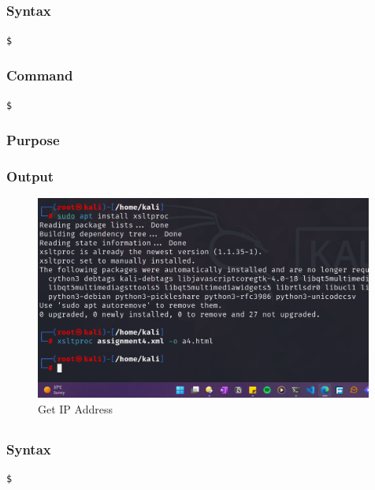 \documentclass[11pt]{article}
\begin{document}
\subsection{}

\subsubsection*{Syntax}
\begin{verbatim}
$
\end{verbatim}

\subsubsection*{Command}
\begin{verbatim}
$
\end{verbatim}

\subsubsection*{Purpose}

\subsubsection*{Output}
\begin{figure}[H]
    \centering
    \includegraphics[width=0.99\textwidth]{a4 (4).png}
    \caption{Get IP Address}
    \label{fig:1}
\end{figure}
\subsection{}

\subsubsection*{Syntax}
\begin{verbatim}
$
\end{verbatim}
\end{document}
